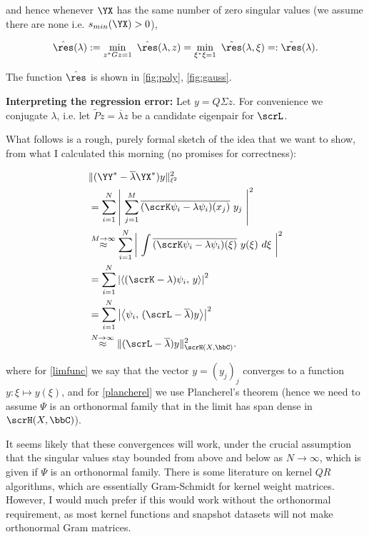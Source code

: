 and hence whenever $\YX$ has the same number of zero singular values (we assume there 
are none i.e. $s_{min} (\YX) > 0$),

\begin{equation}
    \hat{\res} (\lambda) := \min_{z^* G z = 1}\ \hat{\res} (\lambda, z) 
    = \min_{\xi^* \xi = 1}\ \tilde{\res} (\lambda, \xi) =: \tilde{\res} (\lambda) . 
\end{equation}

The function $\hat{\res}$ is shown in \ref{fig:poly}, \ref{fig:gauss}. 

\textbf{Interpreting the regression error:} Let $y = Q \Sigma z$. For convenience we 
conjugate $\lambda$, i.e. let $\tilde{P} z = \overline{\lambda} z$ be a candidate 
eigenpair for $\scrL$. 

What follows is a rough, purely formal sketch of the idea that we want to show, 
from what I calculated this morning (no promises for correctness):

\begin{align}
    &\| (\YY^* - \overline{\lambda} \YX^*) y \|_{\ell^2}^2 \\
    &= \sum_{i=1}^N \left|\ 
        \sum_{j=1}^{M} \overline{(\scrK \psi_i - \lambda \psi_i) (x_j)}\ y_j
     \ \right|^2 \\
    &\stackrel{M \to \infty}{\approx} 
     \sum_{i=1}^{N} \left|\ 
        \int \overline{(\scrK \psi_i - \lambda \psi_i) (\xi)}\ y (\xi)\ d\xi
     \ \right|^2 \label{limfunc} \\
    &= \sum_{i=1}^{N} \left| \left\langle (\scrK - \lambda) \psi_i,\, y \right\rangle \right|^2 \\
    &= \sum_{i=1}^{N} \left| \left\langle \psi_i,\, (\scrL - \overline{\lambda}) y \right\rangle \right|^2 \\
    &\stackrel{N \to \infty}{\approx}
     \| (\scrL - \overline{\lambda}) y \|_{\scrH (X, \bbC)}^2 . \label{plancherel}
\end{align}

where for \ref{limfunc} we say that the vector $y = (y_j)_j$ converges to a function 
$y : \xi \mapsto y (\xi)$, and for \ref{plancherel} we use Plancherel's theorem (hence 
we need to assume $\Psi$ is an orthonormal family that in the limit has span dense in 
$\scrH(X, \bbC)$). 

It seems likely that these convergences will work, under the crucial assumption that 
the singular values stay bounded from above and below as $N \to \infty$, which  is given 
if $\Psi$ is an orthonormal family. There is some literature on kernel $QR$ algorithms, 
which are essentially Gram-Schmidt for kernel weight matrices. However, I would much 
prefer if this would work without the orthonormal requirement, as most kernel functions 
and snapshot datasets will not make orthonormal Gram matrices. 

